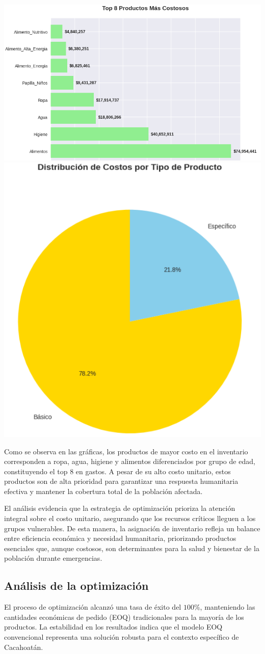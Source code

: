 \documentclass[
  spanish,
  us-letterpaper,
]{scrreprt}
\numberwithin{equation}{chapter} %
\begin{document}
\includegraphics[width=0.55\linewidth,height=\textheight,keepaspectratio]{chapters/costosos.png}
\includegraphics[width=0.4\linewidth,height=\textheight,keepaspectratio]{chapters/costo.png}

Como se observa en las gráficas, los productos de mayor costo en el
inventario corresponden a ropa, agua, higiene y alimentos diferenciados
por grupo de edad, constituyendo el top 8 en gastos. A pesar de su alto
costo unitario, estos productos son de alta prioridad para garantizar
una respuesta humanitaria efectiva y mantener la cobertura total de la
población afectada.

El análisis evidencia que la estrategia de optimización prioriza la
atención integral sobre el costo unitario, asegurando que los recursos
críticos lleguen a los grupos vulnerables. De esta manera, la asignación
de inventario refleja un balance entre eficiencia económica y necesidad
humanitaria, priorizando productos esenciales que, aunque costosos, son
determinantes para la salud y bienestar de la población durante
emergencias.

\subsection{Análisis de la
optimización}\label{anuxe1lisis-de-la-optimizaciuxf3n}

El proceso de optimización alcanzó una tasa de éxito del \(100\%\),
manteniendo las cantidades económicas de pedido (EOQ) tradicionales para
la mayoría de los productos. La estabilidad en los resultados indica que
el modelo EOQ convencional representa una solución robusta para el
contexto específico de Cacahoatán.
\end{document}
